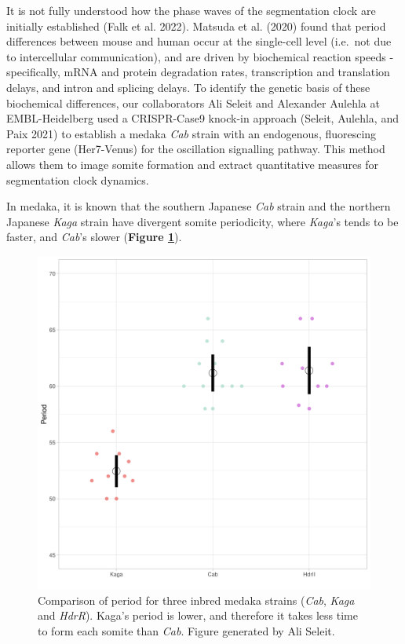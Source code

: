 \documentclass[
]{book}
\begin{document}
It is not fully understood how the phase waves of the segmentation clock are initially established (Falk et al. 2022). Matsuda et al. (2020) found that period differences between mouse and human occur at the single-cell level (i.e.~not due to intercellular communication), and are driven by biochemical reaction speeds - specifically, mRNA and protein degradation rates, transcription and translation delays, and intron and splicing delays. To identify the genetic basis of these biochemical differences, our collaborators Ali Seleit and Alexander Aulehla at EMBL-Heidelberg used a CRISPR-Case9 knock-in approach (Seleit, Aulehla, and Paix 2021) to establish a medaka \emph{Cab} strain with an endogenous, fluorescing reporter gene (Her7-Venus) for the oscillation signalling pathway. This method allows them to image somite formation and extract quantitative measures for segmentation clock dynamics.

In medaka, it is known that the southern Japanese \emph{Cab} strain and the northern Japanese \emph{Kaga} strain have divergent somite periodicity, where \emph{Kaga}'s tends to be faster, and \emph{Cab}'s slower (\textbf{Figure \ref{fig:F0-Cab-Kaga-HdrR}}).



\begin{figure}

\hfill{}\includegraphics[width=1\linewidth]{figs/somites/ali_period_F0_Cab_Kaga} 

\caption{Comparison of period for three inbred medaka strains (\emph{Cab}, \emph{Kaga} and \emph{HdrR}). Kaga's period is lower, and therefore it takes less time to form each somite than \emph{Cab}. Figure generated by Ali Seleit.}\label{fig:F0-Cab-Kaga-HdrR}
\end{figure}
\end{document}
